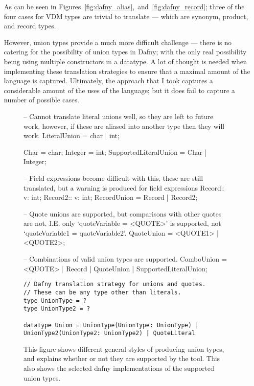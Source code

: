 \documentclass{entcs}
\begin{document}
As can be seen in Figures~\ref{fig:dafny_alias},~and~\ref{fig:dafny_record}; three of the four cases for VDM types are trivial to translate --- which are synonym, product, and record types.

However, union types provide a much more difficult challenge --- there is no catering for the possibility of union types in Dafny; with the only real possibility being using multiple constructors in a datatype. A lot of thought is needed when implementing these translation strategies to ensure that a maximal amount of the language is captured. Ultimately, the approach that I took captures a considerable amount of the uses of the language; but it does fail to capture a number of possible cases.

\begin{figure}[h]
	\begin{center}
        \begin{vdmsl}
-- Cannot translate literal unions well, so they are left to future work, however, if these are aliased into another type then they will work.
LiteralUnion = char | int;

Char = char;
Integer = int;
SupportedLiteralUnion = Char | Integer;

-- Field expressions become difficult with this, these are still translated, but a warning is produced for field expressions
Record::     v: int;
Record2::    v: int;
RecordUnion = Record | Record2;

-- Quote unions are supported, but comparisons with other quotes are not. I.E. only `quoteVariable = <QUOTE>' is supported, not `quoteVariable1 = quoteVariable2'. 
QuoteUnion = <QUOTE1> | <QUOTE2>;

-- Combinations of valid union types are supported. 
ComboUnion = <QUOTE> | Record | QuoteUnion | SupportedLiteralUnion;
        \end{vdmsl}
\begin{lstlisting}[language=Dafny]
// Dafny translation strategy for unions and quotes.
// These can be any type other than literals.
type UnionType = ?
type UnionType2 = ?

datatype Union = UnionType(UnionType: UnionType) | UnionType2(UnionType2: UnionType2) | QuoteLiteral
\end{lstlisting}
        
		\caption{This figure shows different general styles of producing union types, and explains whether or not they are supported by the tool. This also shows the selected dafny implementations of the supported union types.}\label{fig:vdm_failed_unions}
	\end{center}
\end{figure}
\end{document}
